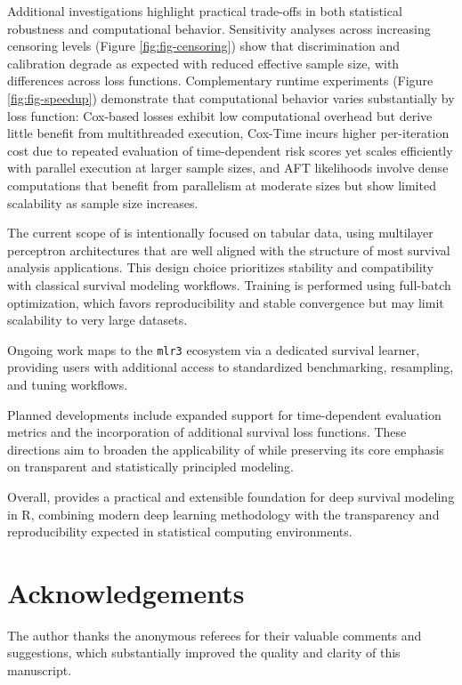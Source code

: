 Additional investigations highlight practical trade-offs in both statistical robustness and computational behavior. Sensitivity analyses across increasing censoring levels (Figure \ref{fig:fig-censoring}) show that discrimination and calibration degrade as expected with reduced effective sample size, with differences across loss functions. Complementary runtime experiments (Figure \ref{fig:fig-speedup}) demonstrate that computational behavior varies substantially by loss function: Cox-based losses exhibit low computational overhead but derive little benefit from multithreaded execution, Cox-Time incurs higher per-iteration cost due to repeated evaluation of time-dependent risk scores yet scales efficiently with parallel execution at larger sample sizes, and AFT likelihoods involve dense computations that benefit from parallelism at moderate sizes but show limited scalability as sample size increases.

The current scope of  is intentionally focused on tabular data, using multilayer perceptron architectures \citep{bengio2021deep} that are well aligned with the structure of most survival analysis applications. This design choice prioritizes stability and compatibility with classical survival modeling workflows. Training is performed using full-batch optimization, which favors reproducibility and stable convergence but may limit scalability to very large datasets.

Ongoing work maps  to the \texttt{mlr3} ecosystem \citep{mlr3} via a dedicated survival learner, providing users with additional access to standardized benchmarking, resampling, and tuning workflows.

Planned developments include expanded support for time-dependent evaluation metrics \citep{uno2007evaluating, blanche2013estimating} and the incorporation of additional survival loss functions. These directions aim to broaden the applicability of  while preserving its core emphasis on transparent and statistically principled modeling.

Overall,  provides a practical and extensible foundation for deep survival modeling in R, combining modern deep learning methodology with the transparency and reproducibility expected in statistical computing environments.

\section{Acknowledgements}\label{acknowledgements}

The author thanks the anonymous referees for their valuable comments and suggestions, which substantially improved the quality and clarity of this manuscript.



\address{%
Imad EL-BADISY\\
AI and Data Science Service, Mohammed VI Center for Research and Innovation (CM6RI)\\%
Rabat, Morocco\\
%
%
\textit{ORCiD: \href{https://orcid.org/0000-0003-4848-4895}{0000-0003-4848-4895}}\\%
\href{mailto:elbadisyimad@gmail.com}{\nolinkurl{elbadisyimad@gmail.com}}%
}
